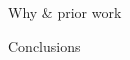 \documentclass[final]{beamer}
\begin{document}
\begin{frame}[t]{}
\begin{columns}
\begin{column}[t]{0.248\textwidth}
\begin{block}{\huge Why \& prior work}
\end{block}
\begin{block}{\huge Conclusions}
\end{block}
\end{column}
\end{columns}
\end{frame}
\end{document}
